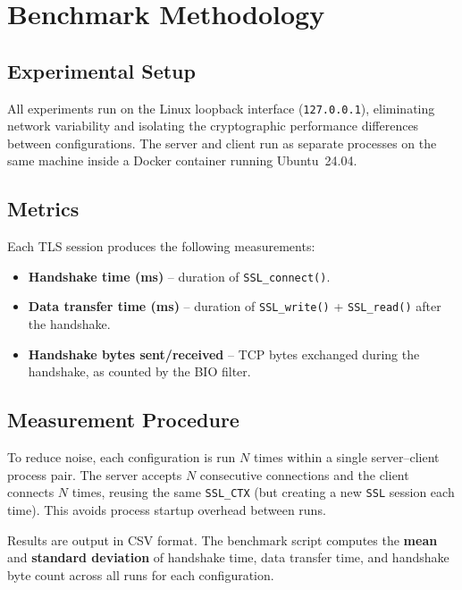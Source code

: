 \documentclass[11pt,a4paper]{article}
\begin{document}
\section{Benchmark Methodology}

\subsection{Experimental Setup}

All experiments run on the Linux loopback interface (\texttt{127.0.0.1}), eliminating network variability and isolating the cryptographic performance differences between configurations. The server and client run as separate processes on the same machine inside a Docker container running Ubuntu~24.04.

\subsection{Metrics}

Each TLS session produces the following measurements:

\begin{itemize}
    \item \textbf{Handshake time (ms)} -- duration of \texttt{SSL\_connect()}.
    \item \textbf{Data transfer time (ms)} -- duration of \texttt{SSL\_write()} + \texttt{SSL\_read()} after the handshake.
    \item \textbf{Handshake bytes sent/received} -- TCP bytes exchanged during the handshake, as counted by the BIO filter.
\end{itemize}

\subsection{Measurement Procedure}

To reduce noise, each configuration is run $N$ times within a single server--client process pair. The server accepts $N$ consecutive connections and the client connects $N$ times, reusing the same \texttt{SSL\_CTX} (but creating a new \texttt{SSL} session each time). This avoids process startup overhead between runs.

Results are output in CSV format. The benchmark script computes the \textbf{mean} and \textbf{standard deviation} of handshake time, data transfer time, and handshake byte count across all runs for each configuration.
\end{document}
